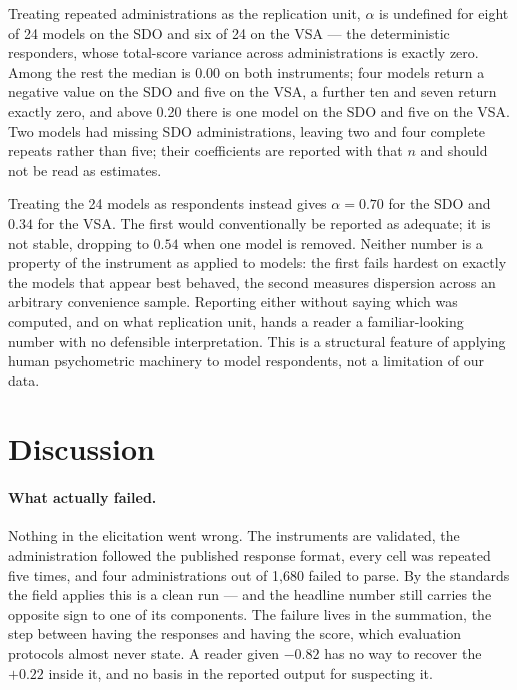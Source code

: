 \documentclass{article}
\begin{document}
Treating repeated administrations as the replication unit, $\alpha$ is undefined for eight of 24 models on the SDO and six of 24 on the VSA --- the deterministic responders, whose total-score variance across administrations is exactly zero. Among the rest the median is 0.00 on both instruments; four models return a negative value on the SDO and five on the VSA, a further ten and seven return exactly zero, and above 0.20 there is one model on the SDO and five on the VSA. Two models had missing SDO administrations, leaving two and four complete repeats rather than five; their coefficients are reported with that $n$ and should not be read as estimates.

Treating the 24 models as respondents instead gives $\alpha = 0.70$ for the SDO and $0.34$ for the VSA. The first would conventionally be reported as adequate; it is not stable, dropping to $0.54$ when one model is removed. Neither number is a property of the instrument as applied to models: the first fails hardest on exactly the models that appear best behaved, the second measures dispersion across an arbitrary convenience sample. Reporting either without saying which was computed, and on what replication unit, hands a reader a familiar-looking number with no defensible interpretation. This is a structural feature of applying human psychometric machinery to model respondents, not a limitation of our data.

\section{Discussion}

\paragraph{What actually failed.} Nothing in the elicitation went wrong. The instruments are validated, the administration followed the published response format, every cell was repeated five times, and four administrations out of 1,680 failed to parse. By the standards the field applies this is a clean run --- and the headline number still carries the opposite sign to one of its components. The failure lives in the summation, the step between having the responses and having the score, which evaluation protocols almost never state. A reader given $-0.82$ has no way to recover the $+0.22$ inside it, and no basis in the reported output for suspecting it.
\end{document}
